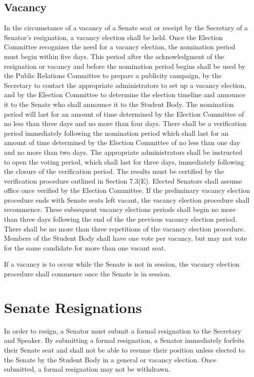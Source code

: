 \documentclass[12pt]{scrreprt}
\begin{document}
\subsection{Vacancy}
In the circumstance of a vacancy of a Senate seat or receipt by the Secretary of a
Senator’s resignation, a vacancy election shall be held. Once the Election
Committee recognizes the need for a vacancy election, the nomination period must
begin within five days. This period after the acknowledgment of the resignation or
vacancy and before the nomination period begins shall be used by the Public
Relations Committee to prepare a publicity campaign, by the Secretary to contact
the appropriate administrators to set up a vacancy election, and by the Election
Committee to determine the election timeline and announce it to the Senate who
shall announce it to the Student Body. The nomination period will last for an
amount of time determined by the Election Committee of no less than three days
and no more than four days. There shall be a verification period immediately following the nomination period which shall last for an amount of time determined
by the Election Committee of no less than one day and no more than two days. The
appropriate administrators shall be instructed to open the voting period, which shall
last for three days, immediately following the closure of the verification period.
The results must be certified by the verification procedure outlined in Section
7.3(E). Elected Senators shall assume office once verified by the Election
Committee. If the preliminary vacancy election procedure ends with Senate seats left vacant,
the vacancy election procedure shall recommence. These subsequent vacancy
elections periods shall begin no more than three days following the end of the the
previous vacancy election period. There shall be no more than three repetitions of
the vacancy election procedure. Members of the Student Body shall have one vote
per vacancy, but may not vote for the same candidate for more than one vacant
seat.

If a vacancy is to occur while the Senate is not in session, the vacancy election
procedure shall commence once the Senate is in session.

\section{Senate Resignations}
In order to resign, a Senator must submit a formal resignation to the Secretary and
Speaker. By submitting a formal resignation, a Senator immediately forfeits their Senate seat and shall not be able to resume their position
unless elected to the Senate by the Student Body in a general or vacancy election. Once submitted, a formal resignation may not be withdrawn.
\end{document}

